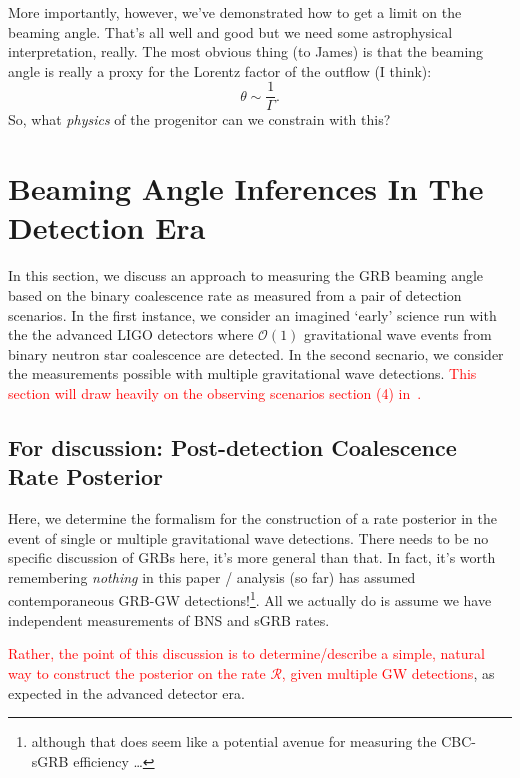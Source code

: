 \documentclass[nofootinbib]{revtex4}
\newcommand{\cbcrate}{{{\mathcal R}}}
\begin{document}
More importantly, however,  we've demonstrated how to get a limit on the beaming
angle.  That's all well and good but we need some astrophysical interpretation,
really.  The most obvious thing (to James) is that the beaming angle is really a
proxy for the Lorentz factor of the outflow (I think):
%
\begin{equation}
\theta \sim \frac{1}{\Gamma}.
\end{equation}
%
So, what \emph{physics} of the progenitor can we constrain with this?

\section{Beaming Angle Inferences In The Detection Era}
In this section, we discuss an approach to measuring the GRB beaming angle based
on the binary coalescence rate as measured from a pair of detection scenarios.
In the first instance, we consider an imagined `early' science run with the the
advanced LIGO detectors where ${\mathcal O}(1)$ gravitational wave events from
binary neutron star coalescence are detected.  In the second secnario, we
consider the measurements possible with multiple gravitational wave detections.
\textcolor{red}{This section will draw heavily on the observing scenarios
section (4) in~\cite{ade_prospects}.}

\subsection{For discussion: Post-detection Coalescence Rate Posterior}
Here, we determine the formalism for the construction of a rate
posterior in the event of single or multiple gravitational wave detections.
%
There needs to be no specific discussion of GRBs here, it's more general than
that.  In fact, it's worth remembering \emph{nothing} in this paper / analysis
(so far) has assumed contemporaneous GRB-GW detections!\footnote{although that
does seem like a potential avenue for measuring the CBC-sGRB efficiency \dots}.
All we actually do is assume we have independent measurements of BNS and sGRB
rates.

\textcolor{red}{Rather, the point of this discussion is to determine/describe
a simple, natural way to construct the posterior on the rate $\cbcrate$, given
multiple GW detections}, as expected in the advanced detector era.
\end{document}
